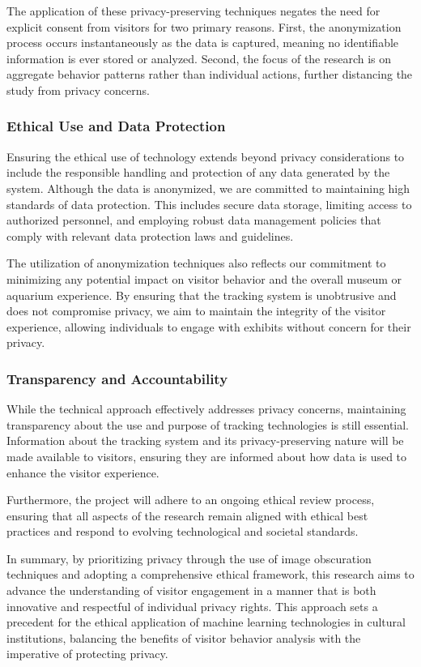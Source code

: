 The application of these privacy-preserving techniques negates the need for explicit consent from visitors for two primary reasons. First, the anonymization process occurs instantaneously as the data is captured, meaning no identifiable information is ever stored or analyzed. Second, the focus of the research is on aggregate behavior patterns rather than individual actions, further distancing the study from privacy concerns.

\subsubsection{Ethical Use and Data Protection}
Ensuring the ethical use of technology extends beyond privacy considerations to include the responsible handling and protection of any data generated by the system. Although the data is anonymized, we are committed to maintaining high standards of data protection. This includes secure data storage, limiting access to authorized personnel, and employing robust data management policies that comply with relevant data protection laws and guidelines.

The utilization of anonymization techniques also reflects our commitment to minimizing any potential impact on visitor behavior and the overall museum or aquarium experience. By ensuring that the tracking system is unobtrusive and does not compromise privacy, we aim to maintain the integrity of the visitor experience, allowing individuals to engage with exhibits without concern for their privacy.

\subsubsection{Transparency and Accountability}
While the technical approach effectively addresses privacy concerns, maintaining transparency about the use and purpose of tracking technologies is still essential. Information about the tracking system and its privacy-preserving nature will be made available to visitors, ensuring they are informed about how data is used to enhance the visitor experience.

Furthermore, the project will adhere to an ongoing ethical review process, ensuring that all aspects of the research remain aligned with ethical best practices and respond to evolving technological and societal standards.

In summary, by prioritizing privacy through the use of image obscuration techniques and adopting a comprehensive ethical framework, this research aims to advance the understanding of visitor engagement in a manner that is both innovative and respectful of individual privacy rights. This approach sets a precedent for the ethical application of machine learning technologies in cultural institutions, balancing the benefits of visitor behavior analysis with the imperative of protecting privacy.


